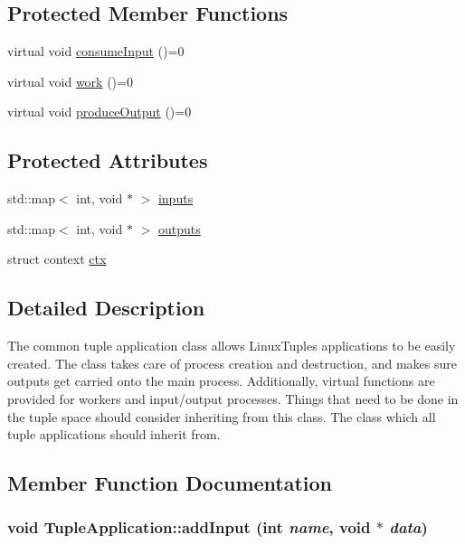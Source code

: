 \subsection*{Protected Member Functions}
\begin{CompactItemize}
\item 
virtual void \hyperlink{class_tuple_application_e163c5a536de01c8b94b49528a17dab2}{consumeInput} ()=0
\item 
virtual void \hyperlink{class_tuple_application_ef6ae8bb1d697e4ed038b43320183c89}{work} ()=0
\item 
virtual void \hyperlink{class_tuple_application_8743dfcf17dedd52887c0b2ab170d8dc}{produceOutput} ()=0
\end{CompactItemize}
\subsection*{Protected Attributes}
\begin{CompactItemize}
\item 
std::map$<$ int, void $\ast$ $>$ \hyperlink{class_tuple_application_92a57e83bfd67542ae58e6a78720a3ef}{inputs}
\item 
std::map$<$ int, void $\ast$ $>$ \hyperlink{class_tuple_application_8abaaa3ef053827d70b3948e6f855082}{outputs}
\item 
struct context \hyperlink{class_tuple_application_773a45a8a04a872fd9c42b9ec07c8ebd}{ctx}
\end{CompactItemize}


\subsection{Detailed Description}
The common tuple application class allows LinuxTuples applications to be easily created. The class takes care of process creation and destruction, and makes sure outputs get carried onto the main process. Additionally, virtual functions are provided for workers and input/output processes. Things that need to be done in the tuple space should consider inheriting from this class. The class which all tuple applications should inherit from. 

\subsection{Member Function Documentation}
\hypertarget{class_tuple_application_892dbd783a1983228ac3865fb082f47a}{
\subsubsection[{addInput}]{\setlength{\rightskip}{0pt plus 5cm}void TupleApplication::addInput (int {\em name}, \/  void $\ast$ {\em data})}}
\label{class_tuple_application_892dbd783a1983228ac3865fb082f47a}


